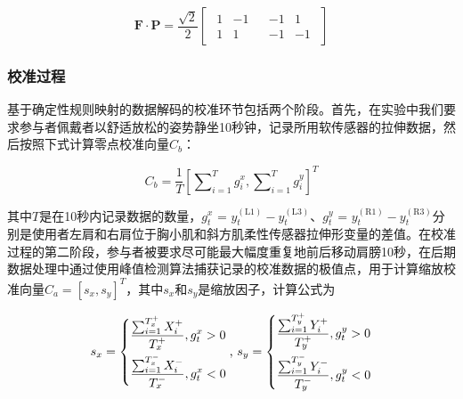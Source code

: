 \[{\mathbf{F}} \cdot {\mathbf{P}} = \frac{{\sqrt 2 }}{2}\left[ {\begin{array}{*{20}{c}}
{\begin{array}{*{20}{c}}
1&{ - 1}  \\  
1&1 
\end{array}}&{\begin{array}{*{20}{c}}
{ - 1}&1  \\  
{ - 1}&{ - 1} 
\end{array}} 
\end{array}} \right]\]   

\subsubsection{校准过程}
基于确定性规则映射的数据解码的校准环节包括两个阶段。首先，在实验中我们要求参与者佩戴者以舒适放松的姿势静坐10秒钟，记录所用软传感器的拉伸数据，然后按照下式计算零点校准向量$C_b$：

\begin{equation}
C_b = \frac{1}{T}{\left[ {\sum\nolimits_{i = 1}^T {{g^x_i}} ,\sum\nolimits_{i = 1}^T {{g^y_i}} } \right]^T}
\label{eq3}
\end{equation}    

其中$T$是在10秒内记录数据的数量，${g^x_t}{\text{ = }}y_t^{({\text{L}}1)} - y_t^{({\text{L}}3)}$、${g^y_t}{\text{ = }}y_t^{({\text{R}}1)} - y_t^{({\text{R}}3)}$分别是使用者左肩和右肩位于胸小肌和斜方肌柔性传感器拉伸形变量的差值。在校准过程的第二阶段，参与者被要求尽可能最大幅度重复地前后移动肩膀10秒，在后期数据处理中通过使用峰值检测算法捕获记录的校准数据的极值点，用于计算缩放校准向量$C_a = {[{s_x},{s_y}]^T}$，其中${s_x}$和${s_y}$是缩放因子，计算公式为

\begin{equation}
{s_x} = \left \{  \begin{gathered}
    \frac{{\sum\nolimits_{i = 1}^{T_x^ + } {X_i^ + } }}{{T_x^ + }},{g^x_t} > 0 \hfill  \\ 
    \frac{{\sum\nolimits_{i = 1}^{T_x^ - } {X_i^ - } }}{{T_x^ - }},{g^x_t} < 0 \hfill  \\  
  \end{gathered}  \right.{\text{, }}{s_y} = \left \{\begin{gathered}
    \frac{{\sum\nolimits_{i = 1}^{T_y^ + } {Y_i^ + } }}{{T_y^ + }},{g^y_t} > 0 \hfill  \\ 
    \frac{{\sum\nolimits_{i = 1}^{T_y^ - } {Y_i^ - } }}{{T_y^ - }},{g^y_t} < 0 \hfill  \\  
  \end{gathered}  \right.
  \label{eq4}
\end{equation}

